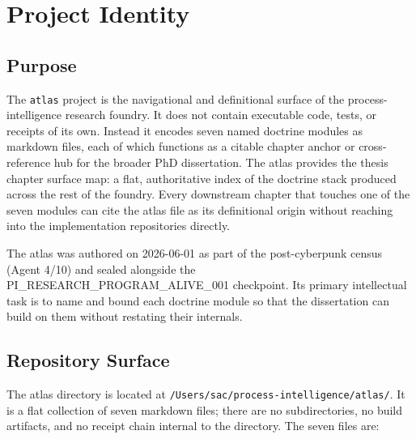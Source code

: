 
\section{Project Identity}
\label{sec:atlas-identity}

\subsection{Purpose}
\label{sec:atlas-identity-purpose}

The \texttt{atlas} project is the navigational and definitional surface of the
process-intelligence research foundry. It does not contain executable code,
tests, or receipts of its own. Instead it encodes seven named doctrine modules
as markdown files, each of which functions as a citable chapter anchor or
cross-reference hub for the broader PhD dissertation. The atlas provides the
thesis chapter surface map: a flat, authoritative index of the doctrine stack
produced across the rest of the foundry. Every downstream chapter that touches
one of the seven modules can cite the atlas file as its definitional origin
without reaching into the implementation repositories directly.

The atlas was authored on 2026-06-01 as part of the post-cyberpunk census
(Agent 4/10) and sealed alongside the PI\_RESEARCH\_PROGRAM\_ALIVE\_001
checkpoint. Its primary intellectual task is to name and bound each doctrine
module so that the dissertation can build on them without restating their
internals.

\subsection{Repository Surface}
\label{sec:atlas-identity-surface}

The atlas directory is located at
\texttt{/Users/sac/process-intelligence/atlas/}. It is a flat collection of
seven markdown files; there are no subdirectories, no build artifacts, and no
receipt chain internal to the directory. The seven files are:


